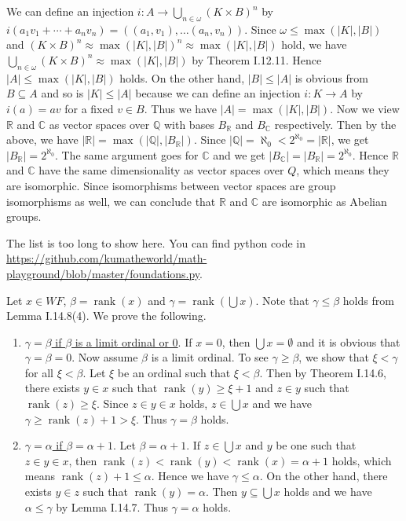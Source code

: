 \documentclass[12pt]{article}
\newcommand{\rank}{\mathop{\mathrm{rank}}}
\theoremstyle{definition}
\newenvironment{customthm}[1]
  {\renewcommand\theinnercustomthm{#1}\innercustomthm}
  {\endinnercustomthm}
\begin{document}
\begin{customthm}{I.13.21} We can define an injection $i:A\rightarrow\bigcup_{n\in\omega}(K\times B)^n$ by $i(a_1v_1+\cdots+a_nv_n)=((a_1,v_1),\ldots(a_n,v_n))$. Since $\omega\leq\max(|K|,|B|)$ and $(K\times B)^n\approx\max(|K|,|B|)^n\approx\max(|K|,|B|)$ hold, we have $\bigcup_{n\in\omega}(K\times B)^n\approx\max(|K|,|B|)$ by Theorem I.12.11. Hence $|A|\leq\max(|K|,|B|)$ holds. On the other hand, $|B|\leq|A|$ is obvious from $B\subseteq A$ and so is $|K|\leq|A|$ because we can define an injection $i:K\rightarrow A$ by $i(a)=av$ for a fixed $v\in B$. Thus we have $|A|=\max(|K|,|B|)$. Now we view $\mathbb{R}$ and $\mathbb{C}$ as vector spaces over $\mathbb{Q}$ with bases $B_\mathbb{R}$ and $B_\mathbb{C}$ respectively. Then by the above, we have $|\mathbb{R}|=\max(|\mathbb{Q}|, |B_\mathbb{R}|)$. Since $|\mathbb{Q}|=\aleph_0<2^{\aleph_0}=|\mathbb{R}|$, we get $|B_\mathbb{R}|=2^{\aleph_0}$. The same argument goes for $\mathbb{C}$ and we get $|B_\mathbb{C}|=|B_\mathbb{R}|=2^{\aleph_0}$. Hence $\mathbb{R}$ and $\mathbb{C}$ have the same dimensionality as vector spaces over $Q$, which means they are isomorphic. Since isomorphisms between vector spaces are group isomorphisms as well, we can conclude that $\mathbb{R}$ and $\mathbb{C}$ are isomorphic as Abelian groups.
\end{customthm}

\begin{customthm}{I.14.4} The list is too long to show here. You can find python code in \url{https://github.com/kumatheworld/math-playground/blob/master/foundations.py}.
\end{customthm}

\begin{customthm}{I.14.9} Let $x\in WF$,  $\beta=\rank(x)$ and $\gamma=\rank(\bigcup x)$. Note that $\gamma\leq\beta$ holds from Lemma I.14.8(4). We prove the following.
\begin{enumerate}
\item\underline{$\gamma=\beta$ if $\beta$ is a limit ordinal or 0}. If $x=0$, then $\bigcup x=\emptyset$ and it is obvious that $\gamma=\beta=0$. Now assume $\beta$ is a limit ordinal. To see $\gamma\geq\beta$, we show that $\xi<\gamma$ for all $\xi<\beta$. Let $\xi$ be an ordinal such that $\xi<\beta$. Then by Theorem I.14.6, there exists $y\in x$ such that $\rank(y)\geq\xi+1$ and $z\in y$ such that $\rank(z)\geq\xi$. Since $z\in y\in x$ holds, $z\in\bigcup x$ and we have $\gamma\geq\rank(z)+1>\xi$. Thus $\gamma=\beta$ holds.
\item\underline{$\gamma=\alpha$ if $\beta=\alpha+1$}. Let $\beta=\alpha+1$. If $z\in\bigcup x$ and $y$ be one such that $z\in y\in x$, then $\rank(z)<\rank(y)<\rank(x)=\alpha+1$ holds, which means $\rank(z)+1\leq\alpha$. Hence we have $\gamma\leq\alpha$. On the other hand, there exists $y\in z$ such that $\rank(y)=\alpha$. Then $y\subseteq\bigcup x$ holds and we have $\alpha\leq\gamma$ by Lemma I.14.7. Thus $\gamma=\alpha$ holds.
\end{enumerate}
\end{customthm}
\end{document}
